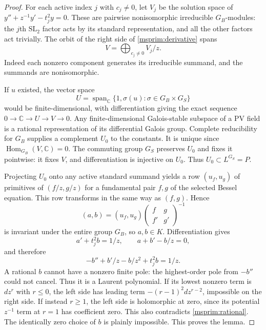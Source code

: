 \documentclass[11pt]{article}
\theoremstyle{definition}
\theoremstyle{remark}
\begin{document}
\begin{proof}
For each active index $j$ with $c_j\ne0$, let $V_j$ be the solution
space of $y''+z^{-1}y'-t_j^2y=0$. These are pairwise nonisomorphic
irreducible $G_B$-modules: the $j$th $\mathrm{SL}_2$ factor acts by
its standard representation, and all the other factors act trivially.
The orbit of the right side of \eqref{msprim:derivative} spans
\[
 V=\bigoplus_{c_j\ne0} V_j/z.
\]
Indeed each nonzero component generates its irreducible summand,
and the summands are nonisomorphic.

If $u$ existed, the vector space
\[
 U=\operatorname{span}_{\mathbb C}\{1,\sigma(u):
                   \sigma\in G_B\times G_S\}
\]
would be finite-dimensional, with differentiation giving the exact
sequence $0\to\mathbb C\to U\to V\to0$. Any finite-dimensional
Galois-stable subspace of a PV field is a rational representation
of its differential Galois group.
Complete reducibility for $G_B$ supplies a complement $U_0$ to the
constants. It is unique since
$\operatorname{Hom}_{G_B}(V,\mathbb C)=0$.
The commuting group $G_S$ preserves $U_0$ and fixes it pointwise:
it fixes $V$, and differentiation is injective on $U_0$.
Thus $U_0\subset L^{G_S}=P$.

Projecting $U_0$ onto any active standard summand yields a row
$(u_f,u_g)$ of primitives of $(f/z,g/z)$ for a fundamental pair
$f,g$ of the selected Bessel equation. This row transforms in the
same way as $(f,g)$. Hence
\[
 (a,b)=(u_f,u_g)
       \begin{pmatrix}f&g\\f'&g'\end{pmatrix}^{-1}
\]
is invariant under the entire group $G_B$, so $a,b\in K$.
Differentiation gives
\[
 a'+t_j^2b=1/z,\qquad a+b'-b/z=0,
\]
and therefore
\begin{equation}\label{msprim:rational}
 -b''+b'/z-b/z^2+t_j^2b=1/z.
\end{equation}
A rational $b$ cannot have a nonzero finite pole: the highest-order
pole from $-b''$ could not cancel. Thus it is a Laurent polynomial.
If its lowest nonzero term is $dz^r$ with $r\le0$, the left side
has leading term $-(r-1)^2dz^{r-2}$, impossible on the right side.
If instead $r\ge1$, the left side is holomorphic at zero, since
its potential $z^{-1}$ term at $r=1$ has coefficient zero.
This also contradicts \eqref{msprim:rational}. The identically zero
choice of $b$ is plainly impossible. This proves the lemma.
\end{proof}
\end{document}
